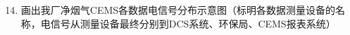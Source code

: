 \documentclass{book}
\begin{document}
\section{}
\begin{enumerate}
	\setcounter{enumi}{13}
\item 画出我厂净烟气CEMS各数据电信号分布示意图（标明各数据测量设备的名称，电信号从测量设备最终分别到DCS系统、环保局、CEMS报表系统）

\end{enumerate}
		\ifx \allfiles \undefined
\end{document}
